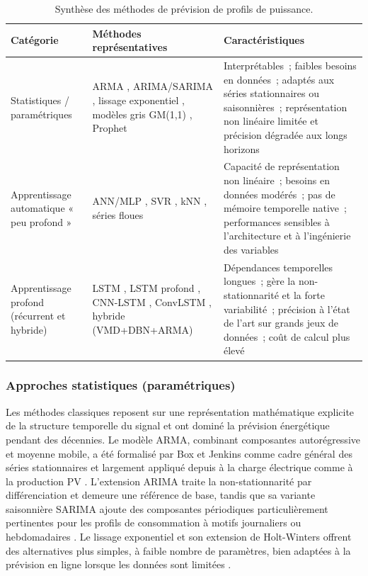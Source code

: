 \begin{table}[h!]
\centering
\caption{Synthèse des méthodes de prévision de profils de puissance.}
\label{tab:forecast_sota_ch4}
\small
\begin{tabularx}{\textwidth}{lXX}
\hline
\textbf{Catégorie} & \textbf{Méthodes représentatives} & \textbf{Caractéristiques} \\ \hline
Statistiques / paramétriques &
  ARMA \cite{wilson_time_2016, chujai_time_nodate},
  ARIMA/SARIMA \cite{wilson_time_2016, bilgili_gross_2023},
  lissage exponentiel \cite{hamdoun_energy_2021},
  modèles gris GM(1,1) \cite{mustafa_forecasting_2025},
  Prophet \cite{mustafa_forecasting_2025} &
  Interprétables~; faibles besoins en données~; adaptés aux séries stationnaires ou
  saisonnières~; représentation non linéaire limitée et précision dégradée aux longs horizons \\ \hline
Apprentissage automatique « peu profond » &
  ANN/MLP \cite{hippert_neural_2001, hamdoun_energy_2021},
  SVR \cite{hamdoun_energy_2021},
  kNN \cite{hamdoun_energy_2021},
  séries floues \cite{mustafa_forecasting_2025} &
  Capacité de représentation non linéaire~; besoins en données modérés~; pas de mémoire
  temporelle native~; performances sensibles à l'architecture et à l'ingénierie des variables \\ \hline
Apprentissage profond (récurrent et hybride) &
  LSTM \cite{hochreiter_long_1997, kong_short-term_2019},
  LSTM profond \cite{shi_deep_2018},
  CNN-LSTM \cite{rafi_short-term_2021},
  ConvLSTM \cite{bai_deep_2022},
  hybride (VMD+DBN+ARMA) \cite{xie_hybrid_2018} &
  Dépendances temporelles longues~; gère la non-stationnarité et la forte variabilité~;
  précision à l'état de l'art sur grands jeux de données~; coût de calcul plus élevé \\ \hline
\end{tabularx}
\end{table}

\subsubsection{Approches statistiques (paramétriques)}

Les méthodes classiques reposent sur une représentation mathématique explicite de la structure temporelle du signal et ont dominé la prévision énergétique pendant des décennies. Le modèle ARMA, combinant composantes autorégressive et moyenne mobile, a été formalisé par Box et Jenkins comme cadre général des séries stationnaires \cite{wilson_time_2016} et largement appliqué depuis à la charge électrique comme à la production PV \cite{chujai_time_nodate, mustafa_forecasting_2025}. L'extension ARIMA traite la non-stationnarité par différenciation et demeure une référence de base, tandis que sa variante saisonnière SARIMA ajoute des composantes périodiques particulièrement pertinentes pour les profils de consommation à motifs journaliers ou hebdomadaires \cite{hamdoun_energy_2021, hasan_state---art_2025}. Le lissage exponentiel et son extension de Holt-Winters offrent des alternatives plus simples, à faible nombre de paramètres, bien adaptées à la prévision en ligne lorsque les données sont limitées \cite{hamdoun_energy_2021}.

